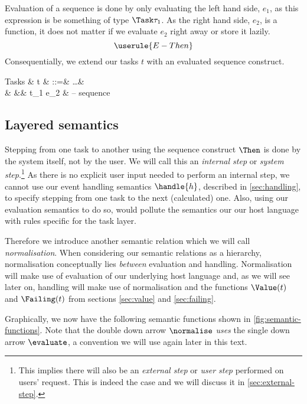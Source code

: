Evaluation of a sequence is done by only evaluating the left hand side, $e_1$,
as this expression is be something of type $\Task \tau_1$.
As the right hand side, $e_2$, is a function,
it does not matter if we evaluate $e_2$ right away or store it lazily.
\begin{equation*}
  \userule{E-Then}
\end{equation*}
Consequentially, we extend our tasks $t$ with an evaluated sequence construct.
\begin{grammar}
  Tasks
    & t & ::=& \ldots        & \\
    &   &\mid& t_1 \Then e_2 & – sequence \\
\end{grammar}


\subsection{Layered semantics}
\label{sec:normalise}
\label{sec:drive}

Stepping from one task to another using the sequence construct $\Then$ is done by the system itself,
not by the user.
We will call this an \emph{internal step} or \emph{system step}.\footnote{
  This implies there will also be an \emph{external step} or \emph{user step} performed on users' request.
  This is indeed the case and we will discuss it in \autoref{sec:external-step}.
}
As there is no explicit user input needed to perform an internal step,
we cannot use our event handling semantics $\handle{h}$,
described in \autoref{sec:handling},
to specify stepping from one task to the next (calculated) one.
Also,
using our evaluation semantics to do so,
would pollute the semantics our our host language with rules specific for the task layer.

Therefore we introduce another semantic relation which we will call \emph{normalisation}.
When considering our semantic relations as a hierarchy,
normalisation conceptually lies \emph{between} evaluation and handling.
Normalisation will make use of evaluation of our underlying host language and,
as we will see later on,
handling will make use of normalisation
and the functions $\Value(t)$ and $\Failing(t)$ from sections \autoref{sec:value} and \autoref{sec:failing}.

Graphically,
we now have the following semantic functions shown in \autoref{fig:semantic-functions}.
Note that the double down arrow $\normalise$ \emph{uses} the single down arrow $\evaluate$,
a convention we will use again later in this text.

